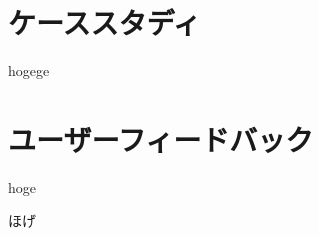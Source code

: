 \documentclass[syuuron]{kuee}
\begin{document}
	
	
	\section{ケーススタディ}
	hogege
	\section{ユーザーフィードバック}
	hoge


\begin{acknowledgements}
	ほげ
\end{acknowledgements}





\end{document}
